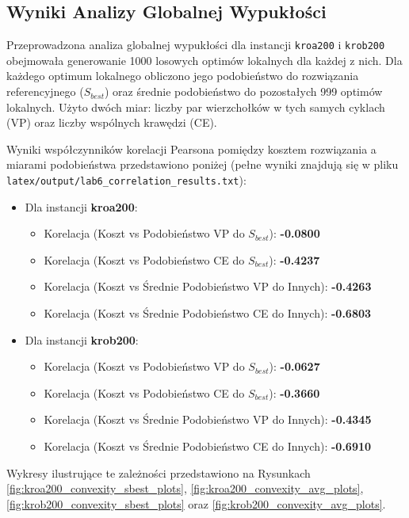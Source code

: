 \documentclass[12pt,a4paper]{article}
\begin{document}
\subsection{Wyniki Analizy Globalnej Wypukłości}
Przeprowadzona analiza globalnej wypukłości dla instancji \texttt{kroa200} i \texttt{krob200} obejmowała generowanie 1000 losowych optimów lokalnych dla każdej z nich. Dla każdego optimum lokalnego obliczono jego podobieństwo do rozwiązania referencyjnego ($S_{best}$) oraz średnie podobieństwo do pozostałych 999 optimów lokalnych. Użyto dwóch miar: liczby par wierzchołków w tych samych cyklach (VP) oraz liczby wspólnych krawędzi (CE).

Wyniki współczynników korelacji Pearsona pomiędzy kosztem rozwiązania a miarami podobieństwa przedstawiono poniżej (pełne wyniki znajdują się w pliku \texttt{latex/output/lab6\_correlation\_results.txt}):
\begin{itemize}
    \item Dla instancji \textbf{kroa200}:
    \begin{itemize}
        \item Korelacja (Koszt vs Podobieństwo VP do $S_{best}$): \textbf{-0.0800}
        \item Korelacja (Koszt vs Podobieństwo CE do $S_{best}$): \textbf{-0.4237}
        \item Korelacja (Koszt vs Średnie Podobieństwo VP do Innych): \textbf{-0.4263}
        \item Korelacja (Koszt vs Średnie Podobieństwo CE do Innych): \textbf{-0.6803}
    \end{itemize}
    \item Dla instancji \textbf{krob200}:
    \begin{itemize}
        \item Korelacja (Koszt vs Podobieństwo VP do $S_{best}$): \textbf{-0.0627}
        \item Korelacja (Koszt vs Podobieństwo CE do $S_{best}$): \textbf{-0.3660}
        \item Korelacja (Koszt vs Średnie Podobieństwo VP do Innych): \textbf{-0.4345}
        \item Korelacja (Koszt vs Średnie Podobieństwo CE do Innych): \textbf{-0.6910}
    \end{itemize}
\end{itemize}

Wykresy ilustrujące te zależności przedstawiono na Rysunkach \ref{fig:kroa200_convexity_sbest_plots}, \ref{fig:kroa200_convexity_avg_plots}, \ref{fig:krob200_convexity_sbest_plots} oraz \ref{fig:krob200_convexity_avg_plots}.
\end{document}
